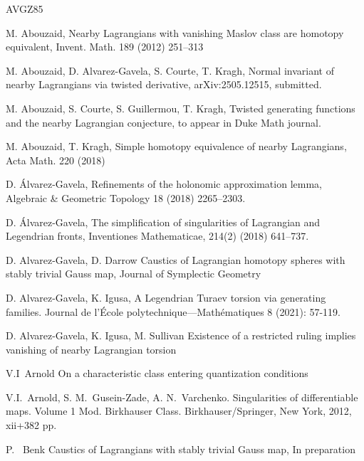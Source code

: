 \documentclass{amsart}
\theoremstyle{definition}
\theoremstyle{remark}
\newtheorem{inductive lemma}[theorem]{Inductive Lemma}
\begin{document}

\begin{thebibliography}{AVGZ85}

 M. Abouzaid,
\newblock  Nearby Lagrangians with vanishing Maslov class are homotopy equivalent,
\newblock  Invent. Math. 189 (2012) 251–313


 M. Abouzaid, D. Alvarez-Gavela, S. Courte, T. Kragh, Normal invariant of nearby Lagrangians via twisted derivative, arXiv:2505.12515, submitted.


 M. Abouzaid, S. Courte, S. Guillermou, T. Kragh, Twisted generating functions and the nearby Lagrangian conjecture, to appear in Duke Math journal.


 M. Abouzaid, T. Kragh,  Simple homotopy equivalence of nearby
Lagrangians, Acta Math. 220 (2018)

   D. \'{A}lvarez-Gavela, 
\newblock  Refinements of the holonomic approximation lemma,  
\newblock Algebraic \& Geometric Topology 18
(2018) 2265–2303.

 D. \'{A}lvarez-Gavela, 
\newblock The simplification of singularities of Lagrangian and Legendrian fronts,  
\newblock Inventiones Mathematicae, 214(2) (2018) 641–737.      

 D. Alvarez-Gavela, D. Darrow
\newblock Caustics of Lagrangian homotopy spheres with stably trivial Gauss map, Journal of Symplectic Geometry
 


 D. Alvarez-Gavela, K. Igusa, 
\newblock A Legendrian Turaev torsion via generating families. Journal de l’\'Ecole polytechnique—Mathématiques 8 (2021): 57-119.

  D. Alvarez-Gavela, K. Igusa, M. Sullivan 
\newblock Existence of a restricted ruling implies vanishing of nearby Lagrangian torsion

V.I~Arnold
\newblock On a characteristic class entering quantization conditions

V.I.~Arnold, S. M.~Gusein-Zade, A. N.~Varchenko.
\newblock Singularities of differentiable maps. Volume 1
\newblock Mod. Birkhauser Class. Birkhauser/Springer, New York, 2012, xii+382 pp.

P.~ Benk
\newblock Caustics of Lagrangians with stably trivial Gauss map,
\newblock In preparation


\end{thebibliography}
\end{document}
